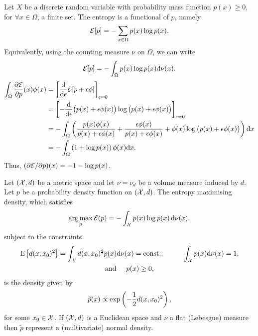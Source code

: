 \begin{example}
  Let $X$ be a discrete random variable with probability mass function $p(x) \geq 0$, for $\forall x \in \Omega$, a finite set.
  The entropy is a functional of $p$, namely
  \[
    {\mathcal E}[p] = - \sum_{x\in\Omega} p(x)\log p(x).
  \]
  Equivalently, using the counting measure $\nu$ on $\Omega$, we can write
  \[
    {\mathcal E}[p] = -\int_\Omega p(x) \log p(x) \text{d}\nu(x).
  \]
  \begin{align*}
    \int_\Omega \frac{\partial{\mathcal E}}{\partial p}(x)\phi(x) 
    &= \left[ \frac{\text{d}}{\text{d} \epsilon} {\mathcal E}[p +  \epsilon\phi] \right]_{\epsilon=0} \\
    &= \left[ -\frac{\text{d}}{\text{d} \epsilon} 
    \big( p(x) + \epsilon\phi(x) \big) 
    \log \big(p(x) + \epsilon\phi(x) \big) 
    \right]_{\epsilon=0} \\
    &= -\int_\Omega \left( 
    \frac{p(x)\phi(x)}{p(x)+\epsilon\phi(x)}
    + \frac{\epsilon\phi(x)}{p(x) + \epsilon\phi(x)}
    + \phi(x)\log\big( p(x) + \epsilon\phi(x) \big)
    \right) \text{d} x \\
    &= -\int_\Omega \left( 1 + \log p(x) \right) \phi(x) \text{d} x.
  \end{align*}
  Thus, $(\partial{\mathcal E}/\partial p)(x) = -1 -\log p(x)$.
\end{example}

\begin{lemma}\label{thm:maxentr}
  Let $({\mathcal X},d)$ be a metric space and let $\nu=\nu_d$ be a volume measure induced by $d$.
  Let $p$ be a probability density function on $({\mathcal X},d)$.
  The entropy maximising density, which satisfies
  \[
    \operatorname*{arg\,max}_{p} {\mathcal E}(p) = - \int_{\mathcal X} p(x) \log p(x) \, \text{d}\nu(x),
  \]
  subject to the constraints
  \begin{align*}
    \begin{gathered}
      \operatorname{E}\big[d(x,x_0)^2\big] = \int_{\mathcal X} d(x,x_0)^2 p(x) \text{d}\nu(x) = \text{const.}, \hspace{1cm} 
      \int_{\mathcal X} p(x) \text{d}\nu(x) = 1, \\
      \text{and} \hspace{0.5cm} p(x) \geq 0,
    \end{gathered}
  \end{align*}
  is the density given by
  \[
    \tilde p(x) \propto \exp \left(-\frac{1}{2} d(x,x_0)^2 \right),
  \]
  for some $x_0\in{\mathcal X}$.
  If $({\mathcal X},d)$ is a Euclidean space and $\nu$ a flat (Lebesgue) measure then $\tilde p$ represent a (multivariate) normal density.
\end{lemma}

